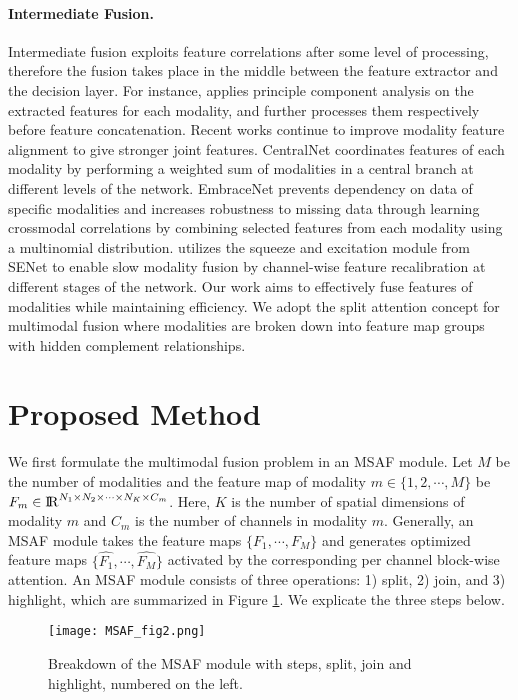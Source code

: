 \documentclass[10pt,twocolumn,letterpaper]{article}
\begin{document}
\paragraph{Intermediate Fusion.}
Intermediate fusion exploits feature correlations after some level of processing, therefore the fusion takes place in the middle between the feature extractor and the decision layer. For instance, \cite{williams2018dnn} applies principle component analysis on the extracted features for each modality, and further processes them respectively before feature concatenation. Recent works continue to improve modality feature alignment to give stronger joint features. CentralNet \cite{vielzeuf2018centralnet} coordinates features of each modality by performing a weighted sum of modalities in a central branch at different levels of the network. EmbraceNet \cite{choi2019embracenet} prevents dependency on data of specific modalities and increases robustness to missing data through learning crossmodal correlations by combining selected features from each modality using a multinomial distribution. \cite{joze2020mmtm} utilizes the squeeze and excitation module from SENet \cite{hu2018squeeze} to enable slow modality fusion by channel-wise feature recalibration at different stages of the network. Our work aims to effectively fuse features of modalities while maintaining efficiency. We adopt the split attention \cite{zhang2020resnest} concept for multimodal fusion where modalities are broken down into feature map groups with hidden complement relationships. 

\section{Proposed Method}
We first formulate the multimodal fusion problem in an MSAF module. Let $M$ be the number of modalities and the feature map of modality $m \in \{1, 2, \cdots, M\}$ be $F_m \in {\rm I\!R}^{N_1 \times N_2 \times \cdots \times N_K \times C_m}$. Here, $K$ is the number of spatial dimensions of modality $m$ and $C_m$ is the number of channels in modality $m$. Generally, an MSAF module takes the feature maps $\{F_1, \cdots, F_M\}$ and generates optimized feature maps $\{\hat{F_1}, \cdots, \hat{F_M}\}$ activated by the corresponding per channel block-wise attention. An MSAF module consists of three operations: 1) split, 2) join, and 3) highlight, which are summarized in Figure \ref{fig2}. We explicate the three steps below.

\begin{figure}[t]
\centering
\texttt{[image: MSAF\_fig2.png]} \caption{Breakdown of the MSAF module with steps, split, join and highlight, numbered on the left.}
\label{fig2}
\end{figure}
\end{document}
